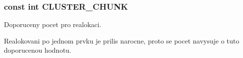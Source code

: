 \subsubsection[{\texorpdfstring{C\+L\+U\+S\+T\+E\+R\+\_\+\+C\+H\+U\+NK}{CLUSTER_CHUNK}}]{\setlength{\rightskip}{0pt plus 5cm}const int C\+L\+U\+S\+T\+E\+R\+\_\+\+C\+H\+U\+NK}\hypertarget{group__DynamickaPamet_gafb09f2bf4615f5ac7a91807aa086d4c3}{}\label{group__DynamickaPamet_gafb09f2bf4615f5ac7a91807aa086d4c3}


Doporuceny pocet pro realokaci. 

Realokovani po jednom prvku je prilis narocne, proto se pocet navysuje o tuto doporucenou hodnotu. 